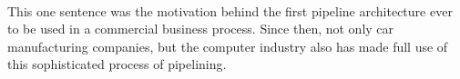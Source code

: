 \vspace*{5mm}
\paragraph*{} {
	
	\vspace*{3mm}
	
	This one sentence was the motivation behind the first pipeline architecture ever to be used in a commercial business process. Since then, not only car manufacturing companies, but the computer industry also has made full use of this sophisticated process of pipelining.
}